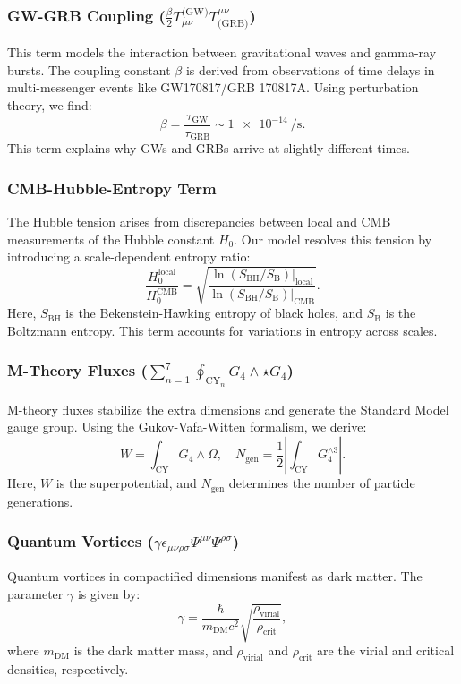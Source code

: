 \documentclass[12pt, a4paper]{article}
\begin{document}
\subsubsection{GW-GRB Coupling ($\frac{\beta}{2} T_{\mu\nu}^{\text{(GW)}} T^{\mu\nu}_{\text{(GRB)}}$)}
This term models the interaction between gravitational waves and gamma-ray bursts. The coupling constant \(\beta\) is derived from observations of time delays in multi-messenger events like GW170817/GRB 170817A. Using perturbation theory, we find:
\[
\beta = \frac{\tau_{\text{GW}}}{\tau_{\text{GRB}}} \sim \SI{1e-14}{\per\second}.
\]
This term explains why GWs and GRBs arrive at slightly different times.

\subsubsection{CMB-Hubble-Entropy Term}
The Hubble tension arises from discrepancies between local and CMB measurements of the Hubble constant \(H_0\). Our model resolves this tension by introducing a scale-dependent entropy ratio:
\[
\frac{H_0^{\text{local}}}{H_0^{\text{CMB}}} = \sqrt{\frac{\ln(S_{\text{BH}}/S_{\text{B}})|_{\text{local}}}{\ln(S_{\text{BH}}/S_{\text{B}})|_{\text{CMB}}}}.
\]
Here, \(S_{\text{BH}}\) is the Bekenstein-Hawking entropy of black holes, and \(S_{\text{B}}\) is the Boltzmann entropy. This term accounts for variations in entropy across scales.

\subsubsection{M-Theory Fluxes ($\sum_{n=1}^7 \oint_{\text{CY}_n} G_4 \wedge \star G_4$)}
M-theory fluxes stabilize the extra dimensions and generate the Standard Model gauge group. Using the Gukov-Vafa-Witten formalism, we derive:
\[
W = \int_{\text{CY}} G_4 \wedge \Omega,\quad N_{\text{gen}} = \frac{1}{2} \left| \int_{\text{CY}} G_4^{\wedge 3} \right|.
\]
Here, \(W\) is the superpotential, and \(N_{\text{gen}}\) determines the number of particle generations.

\subsubsection{Quantum Vortices ($\gamma \epsilon_{\mu\nu\rho\sigma} \Psi^{\mu\nu} \Psi^{\rho\sigma}$)}
Quantum vortices in compactified dimensions manifest as dark matter. The parameter \(\gamma\) is given by:
\[
\gamma = \frac{\hbar}{m_{\text{DM}} c^2} \sqrt{\frac{\rho_{\text{virial}}}{\rho_{\text{crit}}}},
\]
where \(m_{\text{DM}}\) is the dark matter mass, and \(\rho_{\text{virial}}\) and \(\rho_{\text{crit}}\) are the virial and critical densities, respectively.
\end{document}
